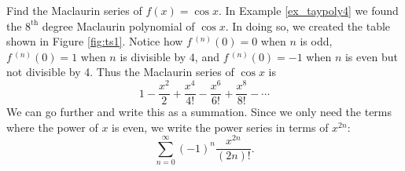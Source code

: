 {Find the Maclaurin series of $f(x)=\cos x$.}
{In Example \ref{ex_taypoly4} we found the $8^\text{th}$ degree Maclaurin polynomial of $\cos x$. In doing so, we created the table shown in Figure \ref{fig:ts1}.
Notice how $f\,^{(n)}(0)=0$ when $n$ is odd,  $f\,^{(n)}(0)=1$ when $n$ is divisible by $4$, and $f\,^{(n)}(0)=-1$ when $n$ is even but not divisible by 4. Thus the Maclaurin series of $\cos x$ is
$$1-\frac{x^2}2+\frac{x^4}{4!}-\frac{x^6}{6!}+\frac{x^8}{8!} - \cdots$$
We can go further and write this as a summation. Since we only need the terms where the power of $x$ is even, we write the power series in terms of $x^{2n}$:
$$\sum_{n=0}^\infty (-1)^{n}\frac{x^{2n}}{(2n)!}.$$}


